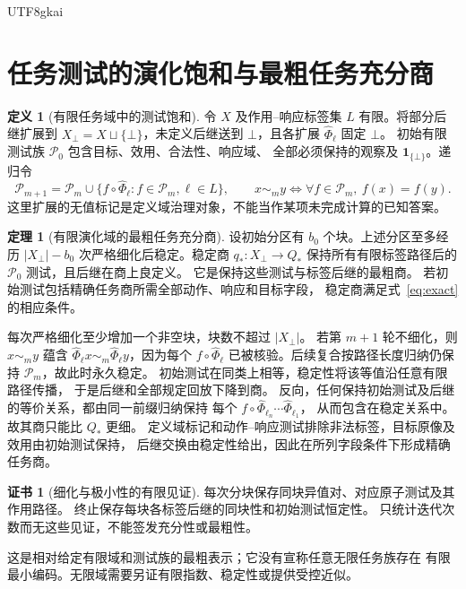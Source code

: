 \documentclass[12pt]{report}
\makeatletter
\theoremstyle{definition}
\newtheorem{definition}{定义}[chapter]
\newtheorem{theorem}{定理}[chapter]
\newtheorem{Certificate}{证书}[chapter]
\renewenvironment{proof}[1][\proofname]{\par
  \pushQED{\qed}\normalfont
  \topsep6\p@\@plus6\p@\relax
  \trivlist
  \item[\hskip\labelsep\normalfont #1\@addpunct{.}]\ignorespaces
}{
  \popQED\endtrivlist\@endpefalse
}
\makeatother
\begin{document}
\begin{CJK*}{UTF8}{gkai}
\section{任务测试的演化饱和与最粗任务充分商}
\begin{definition}[有限任务域中的测试饱和]
令 \(X\) 及作用--响应标签集 \(L\) 有限。将部分后继扩展到
\(X_\bot=X\sqcup\{\bot\}\)，未定义后继送到 \(\bot\)，且各扩展
\(\widehat\Phi_\ell\) 固定 \(\bot\)。
初始有限测试族 \(\mathcal P_0\) 包含目标、效用、合法性、响应域、
全部必须保持的观察及 \(\mathbf1_{\{\bot\}}\)。递归令
\[
\mathcal P_{m+1}=\mathcal P_m\cup
\{f\circ\widehat\Phi_\ell:f\in\mathcal P_m,\ell\in L\},\qquad
x\sim_m y\Longleftrightarrow\forall f\in\mathcal P_m,\ f(x)=f(y).
\]
这里扩展的无值标记是定义域治理对象，不能当作某项未完成计算的已知答案。
\end{definition}
\begin{theorem}[有限演化域的最粗任务充分商]
\label{thm:saturated-quotient}
设初始分区有 \(b_0\) 个块。上述分区至多经历
\(|X_\bot|-b_0\) 次严格细化后稳定。稳定商 \(q_*:X_\bot\to Q_*\)
保持所有有限标签路径后的 \(\mathcal P_0\) 测试，且后继在商上良定义。
它是保持这些测试与标签后继的最粗商。
若初始测试包括精确任务商所需全部动作、响应和目标字段，
稳定商满足式~\eqref{eq:exact} 的相应条件。
\end{theorem}
\begin{proof}
每次严格细化至少增加一个非空块，块数不超过 \(|X_\bot|\)。
若第 \(m+1\) 轮不细化，则 \(x\sim_m y\) 蕴含
\(\widehat\Phi_\ell x\sim_m\widehat\Phi_\ell y\)，因为每个
\(f\circ\widehat\Phi_\ell\) 已被核验。后续复合按路径长度归纳仍保持
\(\mathcal P_m\)，故此时永久稳定。
初始测试在同类上相等，稳定性将该等值沿任意有限路径传播，
于是后继和全部规定回放下降到商。
反向，任何保持初始测试及后继的等价关系，都由同一前缀归纳保持
每个 \(f\circ\widehat\Phi_{\ell_n}\cdots\widehat\Phi_{\ell_1}\)，
从而包含在稳定关系中。故其商只能比 \(Q_*\) 更细。
定义域标记和动作--响应测试排除非法标签，目标原像及效用由初始测试保持，
后继交换由稳定性给出，因此在所列字段条件下形成精确任务商。
\end{proof}
\begin{Certificate}[细化与极小性的有限见证]
每次分块保存同块异值对、对应原子测试及其作用路径。
终止保存每块各标签后继的同块性和初始测试恒定性。
只统计迭代次数而无这些见证，不能签发充分性或最粗性。
\end{Certificate}
这是相对给定有限域和测试族的最粗表示；它没有宣称任意无限任务族存在
有限最小编码。无限域需要另证有限指数、稳定性或提供受控近似。


\end{CJK*}
\end{document}
